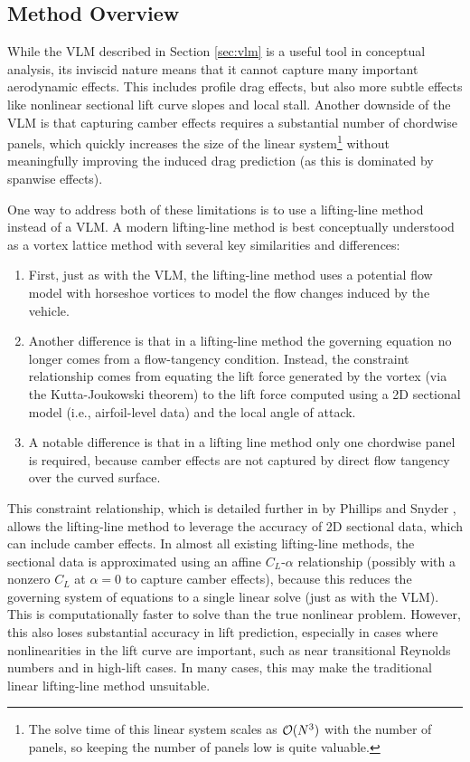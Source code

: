 \subsection{Method Overview}

While the VLM described in Section \ref{sec:vlm} is a useful tool in conceptual analysis, its inviscid nature means that it cannot capture many important aerodynamic effects. This includes profile drag effects, but also more subtle effects like nonlinear sectional lift curve slopes and local stall. Another downside of the VLM is that capturing camber effects requires a substantial number of chordwise panels, which quickly increases the size of the linear system\footnote{The solve time of this linear system scales as $\mathcal{O}(N^3)$ with the number of panels, so keeping the number of panels low is quite valuable.} without meaningfully improving the induced drag prediction (as this is dominated by spanwise effects).

One way to address both of these limitations is to use a lifting-line method instead of a VLM. A modern lifting-line method is best conceptually understood as a vortex lattice method with several key similarities and differences:
\begin{enumerate}
    \item First, just as with the VLM, the lifting-line method uses a potential flow model with horseshoe vortices to model the flow changes induced by the vehicle.
    \item Another difference is that in a lifting-line method the governing equation no longer comes from a flow-tangency condition. Instead, the constraint relationship comes from equating the lift force generated by the vortex (via the Kutta-Joukowski theorem) to the lift force computed using a 2D sectional model (i.e., airfoil-level data) and the local angle of attack.
    \item A notable difference is that in a lifting line method only one chordwise panel is required, because camber effects are not captured by direct flow tangency over the curved surface.
\end{enumerate}

This constraint relationship, which is detailed further in by Phillips and Snyder \cite{phillips_modern_2000}, allows the lifting-line method to leverage the accuracy of 2D sectional data, which can include camber effects. In almost all existing lifting-line methods, the sectional data is approximated using an affine $C_L$-$\alpha$ relationship (possibly with a nonzero $C_L$ at $\alpha=0$ to capture camber effects), because this reduces the governing system of equations to a single linear solve (just as with the VLM). This is computationally faster to solve than the true nonlinear problem. However, this also loses substantial accuracy in lift prediction, especially in cases where nonlinearities in the lift curve are important, such as near transitional Reynolds numbers and in high-lift cases. In many cases, this may make the traditional linear lifting-line method unsuitable.

